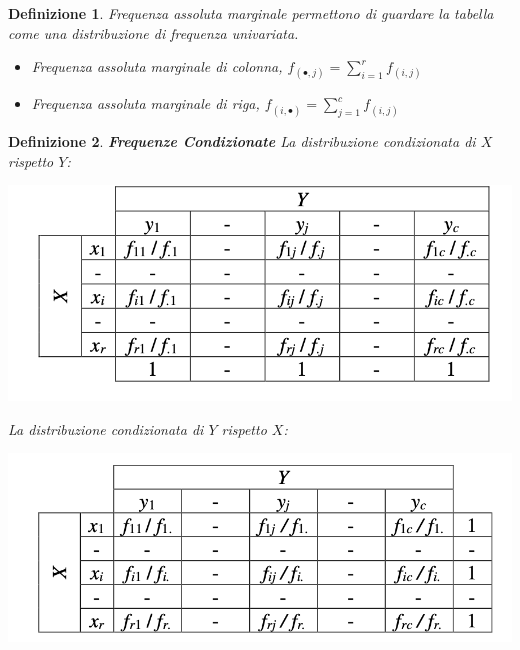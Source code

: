 \documentclass{article}
\newtheorem{definition}{Definizione}[section]
\begin{document}
       
         \begin{definition}{Frequenza assoluta marginale} permettono di guardare la tabella  
         come una distribuzione di frequenza univariata. 
         
                    \begin{itemize}
                        \item Frequenza assoluta marginale di colonna, $f_{(\bullet ,j)} = \sum_{i=1}^{r} f_{(i,j)}$ 
                      \item Frequenza assoluta marginale di riga, $f_{(i,\bullet)} = \sum_{j=1}^{c} f_{(i,j)}$ 
                    \end{itemize}
                \end{definition}
                
             \begin{definition}{\textbf{Frequenze Condizionate}}  
                La distribuzione condizionata di $X$ rispetto $Y$: 
                    \begin{center}
                        \includegraphics[scale=0.2]{image/fcY.png}
                        \end{center}
                La distribuzione condizionata di $Y$ rispetto $X$:    
                         \begin{center}
                             \includegraphics[scale=0.2]{image/fcX.png}
                        \end{center}
                  \end{definition}
    
\end{document}
